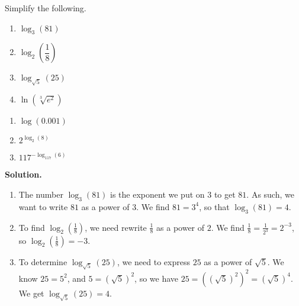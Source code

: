 \begin{ex}  Simplify the following.

\begin{multicols}{4}
\begin{enumerate}

\item  $\log_{3}(81)$ 

\item  $\log_{2}\left(\dfrac{1}{8}\right)$

\item  $\log_{\sqrt{5}}(25)$ 

\item  $\ln\left(\sqrt[3]{e^2}\right)$ 

\setcounter{HW}{\value{enumi}}
\end{enumerate}
\end{multicols}

\begin{multicols}{4}
\begin{enumerate}
\setcounter{enumi}{\value{HW}}

\item  $\log(0.001)$ 

\item  $2^{\log_{2}(8)}$

\item  $117^{-\log_{117}(6)}$

\end{enumerate}
\end{multicols}


{\bf Solution.}

\begin{enumerate}

\item The number $\log_{3}(81)$ is the exponent we put on $3$ to get $81$.  As such, we want to write $81$ as a power of $3$.  We find $81 = 3^{4}$, so that $\log_{3}(81)=4$.

\item To find $\log_{2}\left(\frac{1}{8}\right)$, we need rewrite $\frac{1}{8}$ as a power of $2$.  We find $\frac{1}{8} = \frac{1}{2^{3}} = 2^{-3}$, so $\log_{2}\left(\frac{1}{8}\right) = -3$.

\item To determine $\log_{\sqrt{5}}(25)$, we need to express $25$ as a power of $\sqrt{5}$.  We know $25 = 5^2$, and $5 = \left(\sqrt{5}\right)^2$, so we have $25 = \left(\left(\sqrt{5}\right)^2\right)^2 = \left(\sqrt{5}\right)^4$.  We get $\log_{\sqrt{5}}(25) = 4$.


\end{enumerate}
\end{ex}
